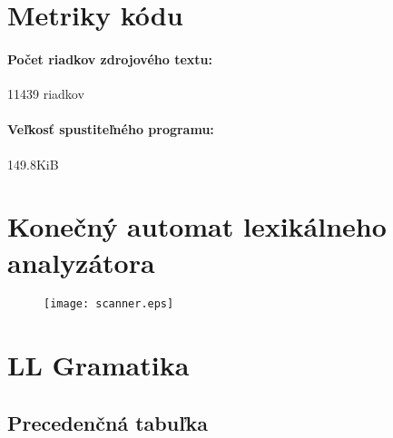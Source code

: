 \documentclass[12pt,a4paper,titlepage,final]{article}
\begin{document}
\appendix

\section{Metriky kódu} \label{metriky}
\paragraph{Počet riadkov zdrojového textu:} 11439 riadkov
\paragraph{Veľkosť spustiteľného programu:} 149.8KiB

\section{Konečný automat lexikálneho analyzátora}\label{chap:scanner}

\begin{figure}[H]
\begin{center}
	\texttt{[image: scanner.eps]}
	\label{fig:scanner}
\end{center}
\end{figure}

%
\section{LL Gramatika} \label{gramatika}



%
\clearpage
\begin{landscape}
	\section{Precedenčná tabuľka} \label{precedencna_tabulka}
	
\end{landscape}
\clearpage
\newpage
\end{document}
